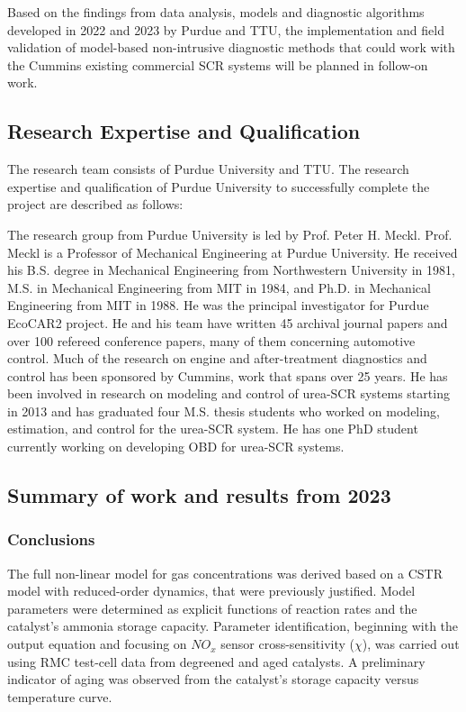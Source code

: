 Based on the findings from data analysis, models and diagnostic algorithms
developed in 2022 and 2023 by Purdue and TTU, the implementation and field
validation of model-based non-intrusive diagnostic methods that could work with
the Cummins existing commercial SCR systems will be planned in follow-on work.

\subsection{Research Expertise and Qualification}
The research team consists of Purdue University and TTU. The research expertise and qualification of Purdue University to successfully complete the project are described as follows:

The research group from Purdue University is led by Prof. Peter H. Meckl. Prof.
Meckl is a Professor of Mechanical Engineering at Purdue University. He received
his B.S. degree in Mechanical Engineering from Northwestern University in 1981,
M.S. in Mechanical Engineering from MIT in 1984, and Ph.D. in Mechanical
Engineering from MIT in 1988. He was the principal investigator for Purdue
EcoCAR2 project. He and his team have written 45 archival journal papers and
over 100 refereed conference papers, many of them concerning automotive control.
Much of the research on engine and after-treatment diagnostics and control has
been sponsored by Cummins, work that spans over 25 years. He has been involved
in research on modeling and control of urea-SCR systems starting in 2013 and has
graduated four M.S. thesis students who worked on modeling, estimation, and
control for the urea-SCR system. He has one PhD student currently
working on developing OBD for urea-SCR systems.



\subsection{Summary of work and results from 2023}

\subsubsection{Conclusions}
The full non-linear model for gas concentrations was derived based on a CSTR
model with reduced-order dynamics, that were previously justified. Model
parameters were determined as explicit functions of reaction rates and the
catalyst's ammonia storage capacity.  Parameter identification, beginning with
the output equation and focusing on $NO_x$ sensor cross-sensitivity ($\chi$),
was carried out using RMC test-cell data from degreened and aged catalysts. A
preliminary indicator of aging was observed from the catalyst's storage capacity
versus temperature curve.
